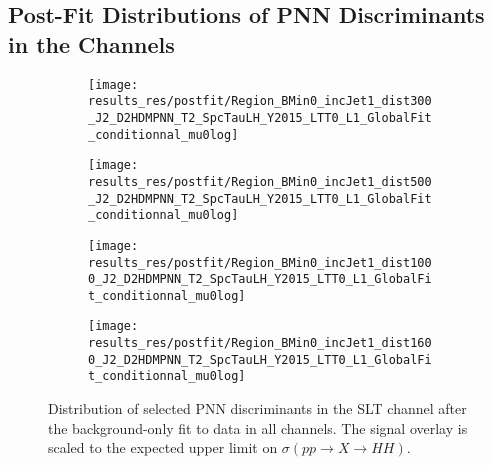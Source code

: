 \subsection{Post-Fit Distributions of PNN Discriminants in the \lephad
  Channels}%
\label{app:pnn_plots_lephad}

\begin{figure}[htbp]
  \centering

  \begin{subfigure}{0.495\textwidth}
    \centering

    \texttt{[image: results\_res/postfit/Region\_BMin0\_incJet1\_dist300\_J2\_D2HDMPNN\_T2\_SpcTauLH\_Y2015\_LTT0\_L1\_GlobalFit\_conditionnal\_mu0log]}
  \end{subfigure}\hfill%
  \begin{subfigure}{0.495\textwidth}
    \centering

    \texttt{[image: results\_res/postfit/Region\_BMin0\_incJet1\_dist500\_J2\_D2HDMPNN\_T2\_SpcTauLH\_Y2015\_LTT0\_L1\_GlobalFit\_conditionnal\_mu0log]}
  \end{subfigure}

  \begin{subfigure}{0.495\textwidth}
    \centering

    \texttt{[image: results\_res/postfit/Region\_BMin0\_incJet1\_dist1000\_J2\_D2HDMPNN\_T2\_SpcTauLH\_Y2015\_LTT0\_L1\_GlobalFit\_conditionnal\_mu0log]}
  \end{subfigure}\hfill%
  \begin{subfigure}{0.495\textwidth}
    \centering

    \texttt{[image: results\_res/postfit/Region\_BMin0\_incJet1\_dist1600\_J2\_D2HDMPNN\_T2\_SpcTauLH\_Y2015\_LTT0\_L1\_GlobalFit\_conditionnal\_mu0log]}
  \end{subfigure}

  \caption[Distribution of selected PNN discriminants in the \lephad SLT channel
  after the background-only fit to data in all channels.]{Distribution of
    selected PNN discriminants in the \lephad SLT channel after the
    background-only fit to data in all channels. The signal overlay is scaled to
    the expected upper limit on $\sigma(pp \to X \to HH)$.}
\end{figure}


